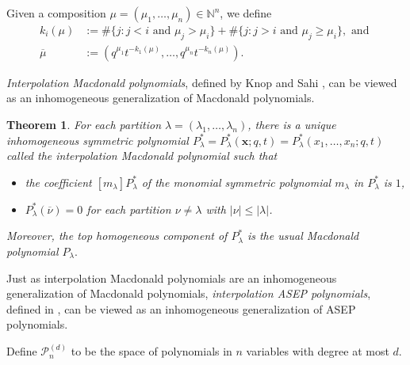 \documentclass[12pt]{amsart}
\newtheorem{thm}{Theorem}[section]
\theoremstyle{definition}
\newcommand{\xx}{\mathbf x}
\newcommand{\mcP}{\mathcal P}
\newcommand{\NN}{\mathbb N}
\def\LW#1{(\textcolor{teal}{LW:#1})}
\begin{document}
Given a composition $\mu=(\mu_1,\dots,\mu_n)\in\NN^n$, we define
\begin{align} \label{eq:k}
k_i(\mu)&:=\#\{j:j<i \text{ and }\mu_j>\mu_i\}+\#\{j:j>i \text{ and }\mu_j\geq \mu_i\}, \text{ and }\\\label{eq:k2}
\overline\mu&:=\left(q^{\mu_1} t^{-k_1(\mu)},\dots,q^{\mu_n} t^{-k_n(\mu)}\right).
\end{align}


\emph{Interpolation Macdonald polynomials}, defined by Knop and Sahi \cite{Knop1997b, Sahi1996}, can be viewed as an inhomogeneous generalization of Macdonald polynomials.
\begin{thm}\cite{Knop1997b, Sahi1996}\label{def:intMacdonald}
For each partition $\lambda=(\lambda_1,\dots,\lambda_n)$, there is a unique inhomogeneous symmetric polynomial $P^*_{\lambda} =P_{\lambda}^*(\xx;q,t) = P_{\lambda}^*(x_1,\dots,x_n;q,t)$ 
called the \emph{interpolation Macdonald polynomial} such that 
\begin{itemize}
    \item the coefficient $[m_{\lambda}]P_{\lambda}^*$ of the 
    monomial symmetric polynomial $m_{\lambda}$ in $P_{\lambda}^*$ is $1$,
    \item $P_{\lambda}^*(\overline{\nu}) = 0$ for each partition $\nu \neq \lambda$ with $|\nu| \leq |\lambda|$.
\end{itemize}
Moreover, the top homogeneous component of 
$P_{\lambda}^*$ is the usual Macdonald polynomial
$P_{\lambda}.$
\end{thm}


 
Just as interpolation Macdonald polynomials are an inhomogeneous generalization of Macdonald polynomials, 
\emph{interpolation ASEP polynomials}, defined in \cite{BenDaliWilliams2025}, can be viewed as an inhomogeneous generalization of ASEP polynomials. 

Define $\mcP_n^{(d)}$ to be the space of polynomials in $n$ variables with degree at most $d$.
\end{document}
